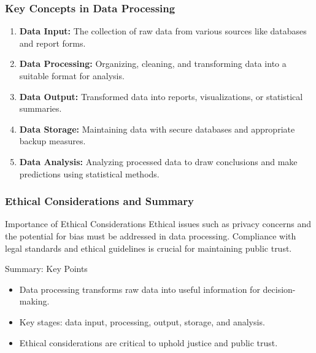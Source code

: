 \documentclass[aspectratio=169]{beamer}
\begin{document}
\begin{frame}[fragile]
    \frametitle{Key Concepts in Data Processing}
    \begin{enumerate}
        \item \textbf{Data Input:}
        The collection of raw data from various sources like databases and report forms.

        \item \textbf{Data Processing:}
        Organizing, cleaning, and transforming data into a suitable format for analysis.

        \item \textbf{Data Output:}
        Transformed data into reports, visualizations, or statistical summaries.

        \item \textbf{Data Storage:}
        Maintaining data with secure databases and appropriate backup measures.

        \item \textbf{Data Analysis:}
        Analyzing processed data to draw conclusions and make predictions using statistical methods.
    \end{enumerate}
\end{frame}

\begin{frame}[fragile]
    \frametitle{Ethical Considerations and Summary}
    \begin{block}{Importance of Ethical Considerations}
        Ethical issues such as privacy concerns and the potential for bias must be addressed in data processing. 
        Compliance with legal standards and ethical guidelines is crucial for maintaining public trust.
    \end{block}

    \begin{block}{Summary: Key Points}
        \begin{itemize}
            \item Data processing transforms raw data into useful information for decision-making.
            \item Key stages: data input, processing, output, storage, and analysis.
            \item Ethical considerations are critical to uphold justice and public trust.
        \end{itemize}
    \end{block}
\end{frame}
\end{document}
